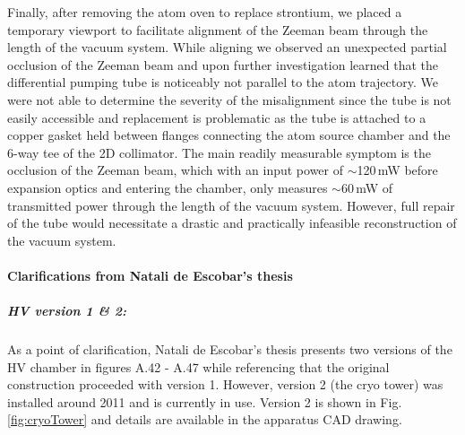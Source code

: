 Finally, after removing the atom oven to replace strontium, we placed a temporary viewport to facilitate alignment of the Zeeman beam through the length of the vacuum system. 
While aligning we observed an unexpected partial occlusion of the Zeeman beam and upon further investigation learned that the differential pumping tube is noticeably not parallel to the atom trajectory.
We were not able to determine the severity of the misalignment since the tube is not easily accessible and replacement is problematic as the tube is attached to a copper gasket held between flanges connecting the atom source chamber and the 6-way tee of the 2D collimator. 
The main readily measurable symptom is the occlusion of the Zeeman beam, which with an input power of $\sim$120\,mW before expansion optics and entering the chamber, only measures $\sim$60\,mW of transmitted power through the length of the vacuum system. 
However, full repair of the tube would necessitate a drastic and practically infeasible reconstruction of the vacuum system.

\paragraph{Clarifications from Natali de Escobar's thesis}
\subparagraph{HV version 1 \& 2:}
As a point of clarification, Natali de Escobar's thesis \cite{MartinezdeEscolar2010} presents two versions of the HV chamber in figures A.42 - A.47 while referencing that the original construction proceeded with version 1. 
However, version 2 (the cryo tower) was installed around 2011 and is currently in use. Version 2 is shown in Fig.\,\ref{fig:cryoTower} and details are available in the apparatus CAD drawing.

